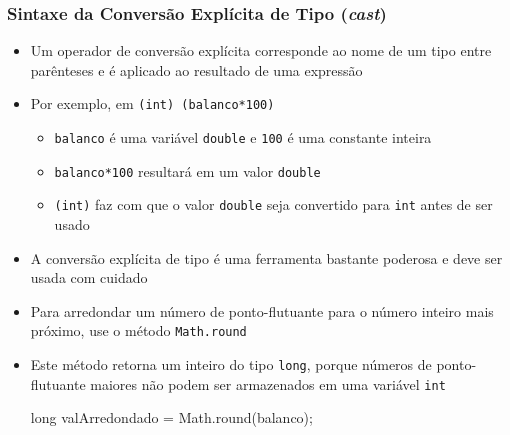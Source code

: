 \documentclass[xcolor={dvipsnames,table},aspectratio=169]{beamer}
\begin{document}
\begin{frame}[fragile]\frametitle{Sintaxe da Conversão Explícita de Tipo (\emph{cast})}
\begin{itemize}
	\item Um operador de conversão explícita corresponde ao nome de um tipo entre parênteses e é aplicado ao resultado de uma expressão
	\item Por exemplo, em \texttt{(int) (balanco*100)}
	\begin{itemize}
		\item \texttt{balanco} é uma variável \texttt{double} e \texttt{100} é uma constante inteira
		\item \texttt{balanco*100} resultará em um valor \texttt{double}
		\item \texttt{(int)} faz com que o valor \texttt{double} seja convertido para \texttt{int} antes de ser usado
	\end{itemize}
	\item A conversão explícita de tipo é uma ferramenta bastante poderosa e deve ser usada com cuidado
	\item Para arredondar um número de ponto-flutuante para o número inteiro mais próximo, use o método \texttt{Math.round}
	\item Este método retorna um inteiro do tipo \texttt{long}, porque números de ponto-flutuante maiores não podem ser armazenados em uma variável \texttt{int}
\begin{javacode}
long valArredondado = Math.round(balanco);
\end{javacode}
\end{itemize}
\end{frame}
\end{document}
